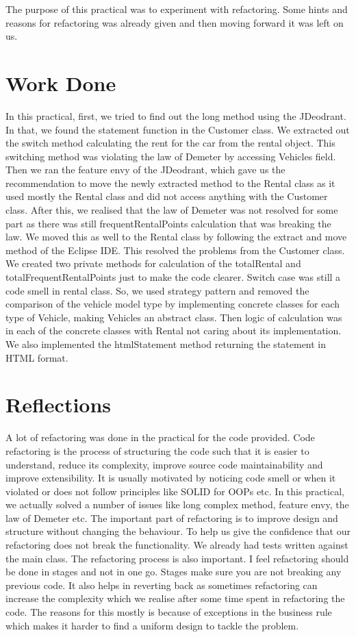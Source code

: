 The purpose of this practical was to experiment with refactoring. Some hints and reasons for refactoring was already given and then moving forward it was left on us.

\section{Work Done}

In this practical, first, we tried to find out the long method using the JDeodrant. In that, we found the statement function in the Customer class. We extracted out the switch method calculating the rent for the car from the rental object. This switching method was violating the law of Demeter by accessing Vehicles field. Then we ran the feature envy of the JDeodrant, which gave us the recommendation to move the newly extracted method to the Rental class as it used mostly the Rental class and did not access anything with the Customer class. After this, we realised that the law of Demeter was not resolved for some part as there was still frequentRentalPoints calculation that was breaking the law. We moved this as well to the Rental class by following the extract and move method of the Eclipse IDE. This resolved the problems from the Customer class. We created two private methods for calculation of the totalRental and totalFrequentRentalPoints just to make the code clearer. Switch case was still a code smell in rental class. So, we used strategy pattern and removed the comparison of the vehicle model type by implementing concrete classes for each type of Vehicle, making Vehicles an abstract class. Then logic of calculation was in each of the concrete classes with Rental not caring about its implementation. We also implemented the htmlStatement method returning the statement in HTML format.

\section{Reflections}

A lot of refactoring was done in the practical for the code provided. Code refactoring is the process of structuring the code such that it is easier to understand, reduce its complexity, improve source code maintainability and improve extensibility. It is usually motivated by noticing code smell or when it violated or does not follow principles like SOLID for OOPs etc. In this practical, we actually solved a number of issues like long complex method, feature envy, the law of Demeter etc. The important part of refactoring is to improve design and structure without changing the behaviour. To help us give the confidence that our refactoring does not break the functionality. We already had tests written against the main class. The refactoring process is also important. I feel refactoring should be done in stages and not in one go. Stages make sure you are not breaking any previous code. It also helps in reverting back as sometimes refactoring can increase the complexity which we realise after some time spent in refactoring the code. The reasons for this mostly is because of exceptions in the business rule which makes it harder to find a uniform design to tackle the problem.

